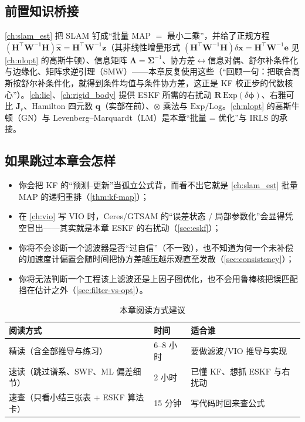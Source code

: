 \subsection*{前置知识桥接}
\cref{ch:slam_est} 把 SLAM 钉成“批量 MAP $=$ 最小二乘”，并给了正规方程 $(\mathbf{H}^\top\mathbf{W}^{-1}\mathbf{H})\hat{\mathbf{x}}=\mathbf{H}^\top\mathbf{W}^{-1}\mathbf{z}$（其非线性增量形式 $(\mathbf{H}^\top\mathbf{W}^{-1}\mathbf{H})\delta\mathbf{x}=\mathbf{H}^\top\mathbf{W}^{-1}\mathbf{e}$ 见 \cref{ch:nlopt} 的高斯牛顿）、信息矩阵 $\boldsymbol{\Lambda}=\boldsymbol{\Sigma}^{-1}$、协方差$\leftrightarrow$信息对偶、舒尔补条件化与边缘化、矩阵求逆引理（SMW）——本章反复使用这些（“回顾一句：把联合高斯按舒尔补条件化，就得到条件均值与条件协方差，这正是 KF 校正步的代数核心”）。\cref{ch:lie}、\cref{ch:rigid_body} 提供 ESKF 所需的右扰动 $\mathbf{R}\,\mathrm{Exp}(\delta\boldsymbol{\phi})$、右雅可比 $\mathbf{J}_r$、Hamilton 四元数 $\mathbf{q}$（实部在前）、$\otimes$ 乘法与 $\mathrm{Exp}/\mathrm{Log}$。\cref{ch:nlopt} 的高斯牛顿（GN）与 Levenberg–Marquardt（LM）是本章“批量 = 优化”与 IRLS 的承接。

\subsection*{如果跳过本章会怎样}
\begin{itemize}
  \item 你会把 KF 的“预测–更新”当孤立公式背，而看不出它就是 \cref{ch:slam_est} 批量 MAP 的递归重排（\cref{thm:kf-map}）；
  \item 在 \cref{ch:vio} 写 VIO 时，Ceres/GTSAM 的“误差状态 / 局部参数化”会显得凭空冒出——其实就是本章 ESKF 的右扰动（\cref{sec:eskf}）；
  \item 你将不会诊断一个滤波器是否“过自信”（不一致），也不知道为何一个未补偿的加速度计偏置会随时间把协方差越压越乐观直至发散（\cref{sec:consistency}）；
  \item 你将无法判断一个工程该上滤波还是上因子图优化，也不会用鲁棒核把误匹配挡在估计之外（\cref{sec:filter-vs-opt}）。
\end{itemize}

\begin{table}[H]\centering\small
\caption{本章阅读方式建议}
\begin{tabular}{lll}
\toprule
阅读方式 & 时间 & 适合谁 \\
\midrule
精读（含全部推导与练习） & 6--8 小时 & 要做滤波/VIO 推导与实现 \\
速读（跳过谱系、SWF、ML 偏差细节） & 2 小时 & 已懂 KF、想抓 ESKF 与右扰动 \\
速查（只看小结三张表 + ESKF 算法卡） & 15 分钟 & 写代码时回来查公式 \\
\bottomrule
\end{tabular}
\end{table}

